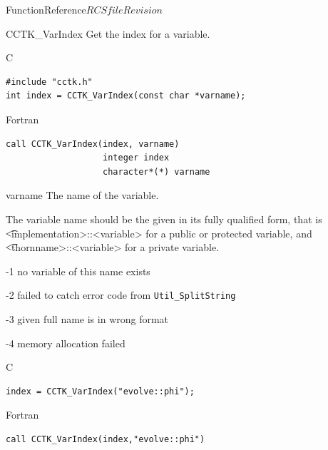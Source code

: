 \begin{cactuspart}{FunctionReference}{$RCSfile$}{$Revision$}
\begin{FunctionDescription}{CCTK\_VarIndex}{}
\label{CCTK-VarIndex}
Get the index for a variable.
\begin{SynopsisSection}
\begin{Synopsis}{C}
\begin{verbatim}
#include "cctk.h"
int index = CCTK_VarIndex(const char *varname);
\end{verbatim}
\end{Synopsis}
\begin{Synopsis}{Fortran}
\begin{verbatim}
call CCTK_VarIndex(index, varname)
                   integer index
                   character*(*) varname
\end{verbatim}
\end{Synopsis}
\end{SynopsisSection}

\begin{ParameterSection}
\begin{Parameter}{varname}
The name of the variable.
\end{Parameter}
\end{ParameterSection}

\begin{Discussion}
The variable name should be the given in its fully qualified form,
that is\\ {\t <implementation>::<variable>} for a public or protected
variable, and\\ {\t <thornname>::<variable>} for a private variable.
\end{Discussion}

\begin{ErrorSection}
\begin{Error}{-1}
no variable of this name exists
\end{Error}
\begin{Error}{-2}
failed to catch error code from \texttt{Util\_SplitString}
\end{Error}
\begin{Error}{-3}
given full name is in wrong format
\end{Error}
\begin{Error}{-4}
memory allocation failed
\end{Error}
\end{ErrorSection}
\begin{ExampleSection}
\begin{Example}{C}
\begin{verbatim}
index = CCTK_VarIndex("evolve::phi");
\end{verbatim}
\end{Example}
\begin{Example}{Fortran}
\begin{verbatim}
call CCTK_VarIndex(index,"evolve::phi")
\end{verbatim}
\end{Example}
\end{ExampleSection}
\end{FunctionDescription}



\end{cactuspart}
